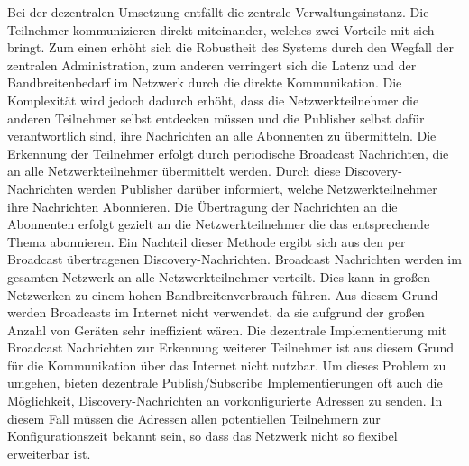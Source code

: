 Bei der dezentralen Umsetzung entfällt die zentrale Verwaltungsinstanz. Die Teilnehmer kommunizieren direkt miteinander, welches zwei Vorteile mit sich bringt. Zum einen erhöht sich die Robustheit des Systems durch den Wegfall der zentralen Administration, zum anderen verringert sich die Latenz und der Bandbreitenbedarf im Netzwerk durch die direkte Kommunikation. Die Komplexität wird jedoch dadurch erhöht, dass die Netzwerkteilnehmer die anderen Teilnehmer selbst entdecken 
müssen und die Publisher selbst dafür verantwortlich sind, ihre Nachrichten an alle Abonnenten zu übermitteln. Die Erkennung der Teilnehmer erfolgt durch periodische Broadcast Nachrichten, die an alle Netzwerkteilnehmer übermittelt werden. Durch diese Discovery-Nachrichten werden Publisher darüber informiert, welche Netzwerkteilnehmer ihre Nachrichten Abonnieren. Die Übertragung der Nachrichten an die Abonnenten erfolgt gezielt an die Netzwerkteilnehmer die das entsprechende Thema abonnieren. Ein Nachteil dieser Methode ergibt sich aus den per Broadcast übertragenen Discovery-Nachrichten. Broadcast Nachrichten werden im gesamten Netzwerk an alle Netzwerkteilnehmer verteilt. Dies kann in großen Netzwerken zu einem hohen Bandbreitenverbrauch führen. Aus diesem Grund werden Broadcasts im Internet nicht verwendet, da sie aufgrund der großen Anzahl von Geräten sehr ineffizient wären. Die dezentrale Implementierung mit Broadcast Nachrichten zur Erkennung weiterer Teilnehmer ist aus diesem Grund für die Kommunikation über das Internet nicht nutzbar. Um dieses Problem zu umgehen, bieten dezentrale Publish/Subscribe Implementierungen oft auch die Möglichkeit, Discovery-Nachrichten an vorkonfigurierte Adressen zu senden. In diesem Fall müssen die Adressen allen potentiellen Teilnehmern zur Konfigurationszeit bekannt sein, so dass das Netzwerk nicht so flexibel erweiterbar ist.

